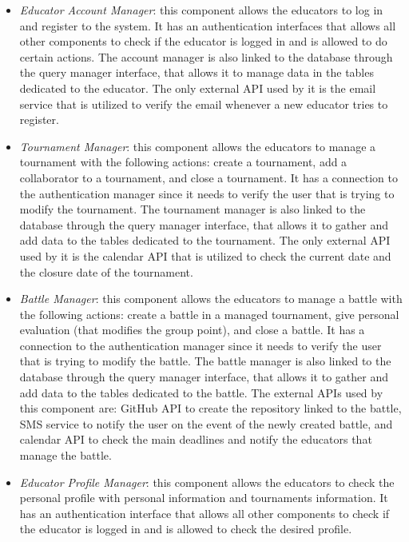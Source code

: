 \documentclass[12pt, a4paper]{report}
\begin{document}
    \begin{itemize}
        \item \textit{Educator Account Manager}: this component allows the educators to log in and register to the system.
            It has an authentication interfaces that allows all other components to check if the educator is logged in and is allowed to do certain actions. 
            The account manager is also linked to the database through the query manager interface, that allows it to manage data in the tables dedicated to the educator.
            The only external API used by it is the email service that is utilized to verify the email whenever a new educator tries to register. 
        \item \textit{Tournament Manager}: this component allows the educators to manage a tournament with the following actions: create a tournament, add a collaborator to a tournament, and close a tournament. 
            It has a connection to the authentication manager since it needs to verify the user that is trying to modify the tournament. 
            The tournament manager is also linked to the database through the query manager interface, that allows it to gather and add data to the tables dedicated to the tournament.
            The only external API used by it is the calendar API that is utilized to check the current date and the closure date of the tournament.
        \item \textit{Battle Manager}: this component allows the educators to manage a battle with the following actions: create a battle in a managed tournament, give personal evaluation (that modifies the group point), and close a battle. 
            It has a connection to the authentication manager since it needs to verify the user that is trying to modify the battle. 
            The battle manager is also linked to the database through the query manager interface, that allows it to gather and add data to the tables dedicated to the battle.
            The external APIs used by this component are: GitHub API to create the repository linked to the battle, SMS service to notify the user on the event of the newly created battle, and calendar API to check the main deadlines and notify the educators that manage the battle.
        \item \textit{Educator Profile Manager}: this component allows the educators to check the personal profile with personal information and tournaments information. 
            It has an authentication interface that allows all other components to check if the educator is logged in and is allowed to check the desired profile. 

\end{itemize}
\end{document}
